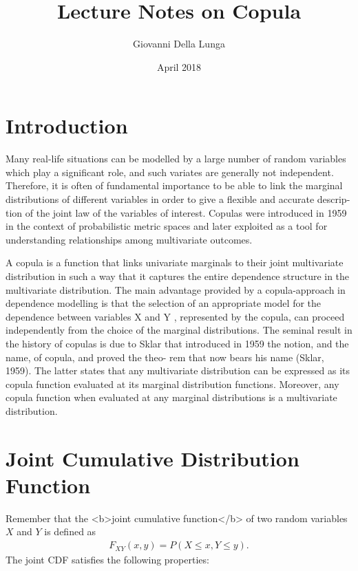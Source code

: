 \documentclass{article}
\title{Lecture Notes on Copula}
\author{Giovanni Della Lunga}
\date{April 2018}
\begin{document}
\maketitle
%
%
\section{Introduction}
 
 Many real-life situations can be modelled by a large number of random variables which play a significant role, and such variates are generally not independent.  Therefore, it is often of fundamental importance to be able to link the marginal distributions of different variables in order to give a flexible and accurate descrip- tion of the joint law of the variables of interest. 	Copulas were introduced in 1959 in the context of probabilistic metric spaces and later exploited as a tool for understanding relationships among multivariate outcomes. 

A copula is a function that links univariate marginals to their joint multivariate distribution in such a way that it captures the entire dependence structure in the multivariate distribution. The main advantage provided by a copula-approach in dependence modelling is that the selection of an appropriate model for the dependence between variables X and Y , represented by the copula, can proceed independently from the choice of the marginal distributions. The seminal result in the history of copulas is due to Sklar that introduced in 1959 the notion, and the name, of copula, and proved the theo- rem that now bears his name (Sklar, 1959). The latter states that any multivariate distribution can be expressed as its copula function evaluated at its marginal distribution functions. Moreover, any copula function when evaluated at any marginal distributions is a multivariate distribution.
%
%
\section{Joint Cumulative Distribution Function }
Remember that the <b>joint cumulative function</b> of two random variables $X$ and $Y$ is defined as
\begin{align}%
\nonumber F_{XY}(x,y)=P(X \leq x, Y \leq y).
\end{align}
The joint CDF satisfies the following properties:
\end{document}
